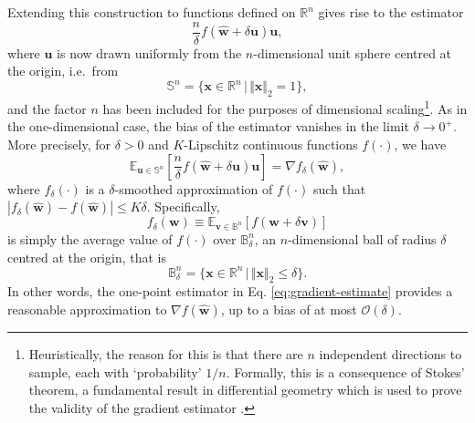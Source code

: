 Extending this construction to functions defined on $\mathbb{R}^n$ gives rise to the estimator
\begin{equation}
\label{eq:gradient-estimate}
	\frac{n}{\delta}f(\widehat{\mathbf{w}} + \delta \mathbf{u})\mathbf{u},
\end{equation}
where $\mathbf{u}$ is now drawn uniformly from the $n$-dimensional unit sphere centred at the origin, i.e.\ from
\begin{equation}
	\mathbb{S}^n
	= \big\{\mathbf{x} \in \mathbb{R}^n \, \big| \, \Vert\mathbf{x}\Vert_2 = 1\big\},
\end{equation}
and the factor $n$ has been included for the purposes of dimensional scaling\footnote{Heuristically, the reason for this is that there are $n$ independent directions to sample, each with `probability' $1/n$. Formally, this is a consequence of Stokes' theorem, a fundamental result in differential geometry which is used to prove the validity of the gradient estimator \citep[Lemma~2.1.]{flaxman05}.}. As in the one-dimensional case, the bias of the estimator vanishes in the limit $\delta \rightarrow 0^+$. More precisely, for $\delta > 0$ and $K$-Lipschitz continuous functions $f(\cdot)$, we have
\begin{equation}
	\mathbb{E}_{\mathbf{u} \in \mathbb{S}^n}\left[\frac{n}{\delta}f(\widehat{\mathbf{w}} + \delta\mathbf{u})\mathbf{u}\right]
	= \nabla f_{\delta}(\widehat{\mathbf{w}}),
\end{equation}
where $f_{\delta}(\cdot)$ is a $\delta$-smoothed approximation of $f(\cdot)$ such that $|f_{\delta}(\widehat{\mathbf{w}}) - f(\widehat{\mathbf{w}})| \leq K\delta$. Specifically,
\begin{equation}
\label{eq:delta-smoothed-loss}
	f_{\delta}(\mathbf{w})
	\equiv \mathbb{E}_{\mathbf{v} \in \mathbb{B}^n}[f(\mathbf{w} + \delta\mathbf{v})]
\end{equation}
is simply the average value of $f(\cdot)$ over $\mathbb{B}^n_\delta$, an $n$-dimensional ball of radius $\delta$ centred at the origin, that is
\begin{equation}
	\mathbb{B}^n_\delta
	= \big\{\mathbf{x} \in \mathbb{R}^n \, \big| \, \Vert\mathbf{x}\Vert_2 \leq \delta\big\}.
\end{equation} 
In other words, the one-point estimator in Eq. \eqref{eq:gradient-estimate} provides a reasonable approximation to $\nabla f(\widehat{\mathbf{w}})$, up to a bias of at most $\mathcal{O}(\delta)$.

